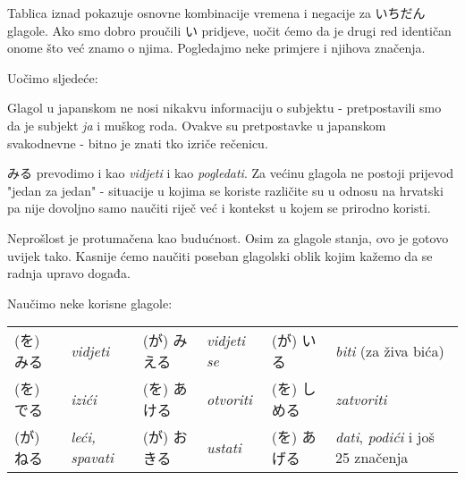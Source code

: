 	Tablica iznad pokazuje osnovne kombinacije vremena i negacije za いちだん glagole. Ako smo dobro proučili い pridjeve, uočit ćemo da je drugi red identičan onome što već znamo o njima. Pogledajmo neke primjere i njihova značenja.
	
	\begin{reibun}
	\end{reibun}
	
	Uočimo sljedeće:
	\begin{hyou}
		\item Glagol u japanskom ne nosi nikakvu informaciju o subjektu - pretpostavili smo da je subjekt \textit{ja} i muškog roda. Ovakve su pretpostavke u japanskom svakodnevne - bitno je znati tko izriče rečenicu.
		\item みる prevodimo i kao \textit{vidjeti} i kao \textit{pogledati}. Za većinu glagola ne postoji prijevod "jedan za jedan" - situacije u kojima se koriste različite su u odnosu na hrvatski pa nije dovoljno samo naučiti riječ već i kontekst u kojem se prirodno koristi.
		\item Neprošlost je protumačena kao budućnost. Osim za glagole stanja, ovo je gotovo uvijek tako. Kasnije ćemo naučiti poseban glagolski oblik kojim kažemo da se radnja upravo događa.
	\end{hyou}
	
	
	Naučimo neke korisne glagole:
	
	\vspace{10pt}
	\begin{tabular}{l l l l l l}
		(を) みる & \textit{vidjeti} & (が) みえる & \textit{vidjeti se} & (が) いる & \textit{biti} (za živa bića)\\
		(を) でる & \textit{izići} & (を) あける & \textit{otvoriti} & (を) しめる & \textit{zatvoriti}\\
		(が) ねる & \textit{leći, spavati} & (が) おきる & \textit{ustati} & (を) あげる & \textit{dati}, \textit{podići} i još 25 značenja\\
	\end{tabular}

	
